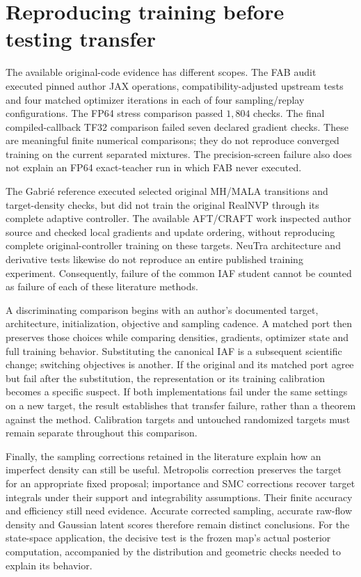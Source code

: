 \section[Reproduction and transfer]{Reproducing training before testing transfer}
\label{sec:neutra-original-code-comparison}

The available original-code evidence has different scopes. The FAB audit
executed pinned author JAX operations, compatibility-adjusted upstream tests
and four matched optimizer iterations in each of four sampling/replay
configurations. The FP64 stress comparison passed $1{,}804$ checks. The final
compiled-callback TF32 comparison failed seven declared gradient checks.
These are meaningful finite numerical comparisons; they do not reproduce
converged training on the current separated mixtures. The precision-screen
failure also does not explain an FP64 exact-teacher run in which FAB never
executed.

The Gabri\'e reference executed selected original MH/MALA transitions and
target-density checks, but did not train the original RealNVP through its
complete adaptive controller. The available AFT/CRAFT work inspected author
source and checked local gradients and update ordering, without reproducing
complete original-controller training on these targets. NeuTra architecture
and derivative tests likewise do not reproduce an entire published training
experiment. Consequently, failure of the common IAF student cannot be
counted as failure of each of these literature methods.

A discriminating comparison begins with an author's documented target,
architecture, initialization, objective and sampling cadence. A matched
port then preserves those choices while comparing densities, gradients,
optimizer state and full training behavior. Substituting the canonical IAF
is a subsequent scientific change; switching objectives is another.
If the original and its matched port agree but fail after the substitution,
the representation or its training calibration becomes a specific suspect.
If both implementations fail under the same settings on a new target,
the result establishes that transfer failure, rather than a theorem against
the method. Calibration targets and untouched randomized targets must remain
separate throughout this comparison.

Finally, the sampling corrections retained in the literature explain how an
imperfect density can still be useful. Metropolis correction preserves the
target for an appropriate fixed proposal; importance and SMC corrections
recover target integrals under their support and integrability assumptions.
Their finite accuracy and efficiency still need evidence. Accurate corrected
sampling, accurate raw-flow density and Gaussian latent scores therefore
remain distinct conclusions. For the state-space application, the decisive
test is the frozen map's actual posterior computation, accompanied by the
distribution and geometric checks needed to explain its behavior.

